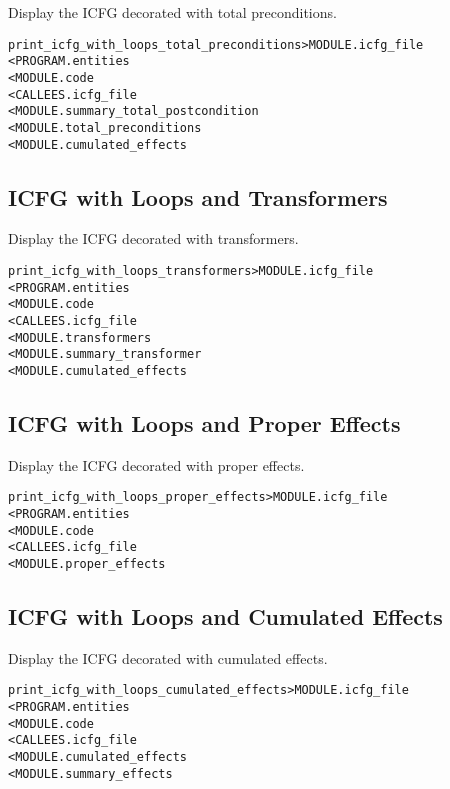 \documentclass[a4paper]{report}
\newenvironment{PipsMake}{\begin{alltt}}{\end{alltt}}
\newenvironment{PipsPass}[1]{\label{pass:#1}}{}
\begin{document}
\begin{PipsPass}{print_icfg_with_loops_total_preconditions}
Display the ICFG decorated with total preconditions.
\end{PipsPass}
\begin{PipsMake}
print_icfg_with_loops_total_preconditions      > MODULE.icfg_file
        < PROGRAM.entities
        < MODULE.code
        < CALLEES.icfg_file
        < MODULE.summary_total_postcondition
        < MODULE.total_preconditions
        < MODULE.cumulated_effects
\end{PipsMake}

\subsection{ICFG with Loops and Transformers}

\begin{PipsPass}{print_icfg_with_loops_transformers}
Display the ICFG decorated with transformers.
\end{PipsPass}
\begin{PipsMake}
print_icfg_with_loops_transformers       > MODULE.icfg_file
        < PROGRAM.entities
        < MODULE.code
        < CALLEES.icfg_file
        < MODULE.transformers
        < MODULE.summary_transformer
        < MODULE.cumulated_effects
\end{PipsMake}

\subsection{ICFG with Loops and Proper Effects}

\begin{PipsPass}{print_icfg_with_loops_proper_effects}
Display the ICFG decorated with proper effects.
\end{PipsPass}
\begin{PipsMake}
print_icfg_with_loops_proper_effects     > MODULE.icfg_file
        < PROGRAM.entities
        < MODULE.code
        < CALLEES.icfg_file
        < MODULE.proper_effects
\end{PipsMake}

\subsection{ICFG with Loops and Cumulated Effects}

\begin{PipsPass}{print_icfg_with_loops_cumulated_effects}
Display the ICFG decorated with cumulated effects.
\end{PipsPass}
\begin{PipsMake}
print_icfg_with_loops_cumulated_effects        > MODULE.icfg_file
        < PROGRAM.entities
        < MODULE.code
        < CALLEES.icfg_file
        < MODULE.cumulated_effects
        < MODULE.summary_effects
\end{PipsMake}
\end{document}
